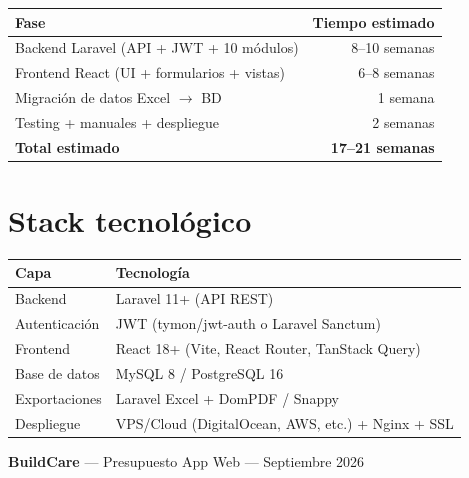 \documentclass[11pt,a4paper]{article}
\begin{document}
\begin{table}[h]
\centering
\begin{tabular}{@{}lr@{}}
\toprule
\textbf{Fase} & \textbf{Tiempo estimado} \\
\midrule
Backend Laravel (API + JWT + 10 m\'odulos) & 8--10 semanas \\
Frontend React (UI + formularios + vistas) & 6--8 semanas \\
Migraci\'on de datos Excel $\rightarrow$ BD & 1 semana \\
Testing + manuales + despliegue & 2 semanas \\
\midrule
\textbf{Total estimado} & \textbf{17--21 semanas} \\
\bottomrule
\end{tabular}
\end{table}

\section{Stack tecnol\'ogico}

\begin{table}[h]
\centering
\begin{tabular}{@{}ll@{}}
\toprule
\textbf{Capa} & \textbf{Tecnolog\'ia} \\
\midrule
Backend & Laravel 11+ (API REST) \\
Autenticaci\'on & JWT (tymon/jwt-auth o Laravel Sanctum) \\
Frontend & React 18+ (Vite, React Router, TanStack Query) \\
Base de datos & MySQL 8 / PostgreSQL 16 \\
Exportaciones & Laravel Excel + DomPDF / Snappy \\
Despliegue & VPS/Cloud (DigitalOcean, AWS, etc.) + Nginx + SSL \\
\bottomrule
\end{tabular}
\end{table}

\vfill
\begin{center}
\small\textcolor{buildcare}{\textbf{BuildCare} --- Presupuesto App Web --- Septiembre 2026}
\end{center}
\end{document}
